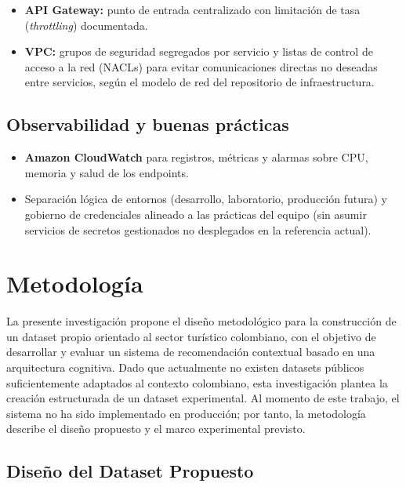 \documentclass[12pt, letterpaper]{article}
\begin{document}
\begin{itemize}
\item \textbf{API Gateway:} punto de entrada centralizado con limitación de tasa (\textit{throttling}) documentada.
\item \textbf{VPC:} grupos de seguridad segregados por servicio y listas de control de acceso a la red (NACLs) para evitar comunicaciones directas no deseadas entre servicios, según el modelo de red del repositorio de infraestructura.
\end{itemize}

\subsection{Observabilidad y buenas prácticas}

\begin{itemize}
\item \textbf{Amazon CloudWatch} para registros, métricas y alarmas sobre CPU, memoria y salud de los endpoints.
\item Separación lógica de entornos (desarrollo, laboratorio, producción futura) y gobierno de credenciales alineado a las prácticas del equipo (sin asumir servicios de secretos gestionados no desplegados en la referencia actual).
\end{itemize}

\section{Metodología}

La presente investigación propone el diseño metodológico para la construcción de un dataset propio orientado al sector turístico colombiano, con el objetivo de desarrollar y evaluar un sistema de recomendación contextual basado en una arquitectura cognitiva. Dado que actualmente no existen datasets públicos suficientemente adaptados al contexto colombiano, esta investigación plantea la creación estructurada de un dataset experimental. Al momento de este trabajo, el sistema no ha sido implementado en producción; por tanto, la metodología describe el diseño propuesto y el marco experimental previsto.

\subsection{Diseño del Dataset Propuesto}
\end{document}
